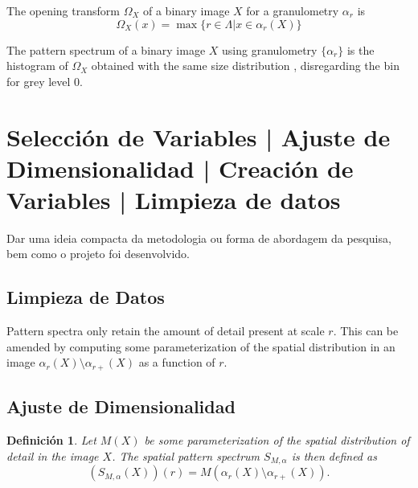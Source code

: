 \documentclass{sciposter}
\newtheorem{Def}{Definici\'on}
\begin{document}
\begin{multicols}{3}
The opening transform \cite{Nacken:thesis} $\Omega_X$ of a binary image $X$ 
for a granulometry ${\alpha_r}$ is
\begin{equation}
  \Omega_X(x) = \max\{ r \in \Lambda \vert x \in \alpha_r(X) \}
\end{equation}

The pattern spectrum of a binary image $X$ using granulometry 
$\{\alpha_r\}$ is the histogram of $\Omega_X$ obtained with the same 
size distribution \cite{Nacken:thesis}, disregarding the bin for grey level 0.

\section{Selecci\'on de Variables | Ajuste de Dimensionalidad | Creaci\'on de Variables | Limpieza de datos}
Dar uma ideia compacta da metodologia ou forma de abordagem da pesquisa, bem como o projeto foi desenvolvido.
\subsection{Limpieza de Datos}
Pattern spectra only retain the amount of detail present at  scale $r$.
This can be amended by computing some parameterization of the spatial 
distribution in an image $\alpha_r(X) \setminus \alpha_{r+}(X)$ as a function of $r$. 

\subsection{Ajuste de Dimensionalidad}

\begin{Def}
Let ${M}(X)$ be some parameterization of the spatial distribution of detail
in the image $X$. The spatial pattern spectrum ${S}_{{M},\alpha}$ is
then defined as
\begin{equation}
  ({S}_{{M},\alpha}(X))(r) = {M}(\alpha_r(X) \setminus \alpha_{r+}(X)).
\end{equation}  
\end{Def}


\end{multicols}
\end{document}
